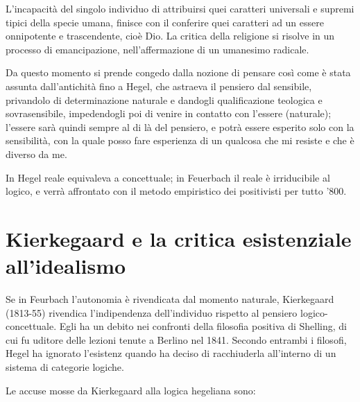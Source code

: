 L'incapacità del singolo individuo di attribuirsi quei caratteri universali e supremi tipici della specie umana, finisce con il conferire quei caratteri ad un essere onnipotente e trascendente, cioè Dio. La critica della religione si risolve in un processo di emancipazione, nell'affermazione di un umanesimo radicale.

Da questo momento si prende congedo dalla nozione di pensare così come è stata assunta dall'antichità fino a Hegel, che astraeva il pensiero dal sensibile, privandolo di determinazione naturale e dandogli qualificazione teologica e sovrasensibile, impedendogli poi di venire in contatto con l'essere (naturale); l'essere sarà quindi sempre al di là del pensiero, e potrà essere esperito solo con la sensibilità, con la quale posso fare esperienza di un qualcosa che mi resiste e che è diverso da me.

In Hegel reale equivaleva a concettuale; in Feuerbach il reale è irriducibile al logico, e verrà affrontato con il metodo empiristico dei positivisti per tutto '800.

\section{Kierkegaard e la critica esistenziale all'idealismo}

Se in Feurbach l'autonomia è rivendicata dal momento naturale, Kierkegaard (1813-55) rivendica l'indipendenza dell'individuo rispetto al pensiero logico-concettuale. Egli ha un debito nei confronti della filosofia positiva di Shelling, di cui fu uditore delle lezioni tenute a Berlino nel 1841. Secondo entrambi i filosofi, Hegel ha ignorato l'esistenz quando ha deciso di racchiuderla all'interno di un sistema di categorie logiche.

Le accuse mosse da Kierkegaard alla logica hegeliana sono:

